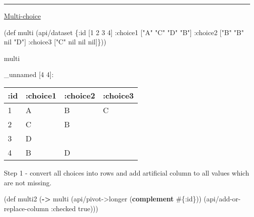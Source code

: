 \documentclass[]{article}
\newenvironment{Shaded}{\begin{snugshade}}{\end{snugshade}}
\newcommand{\AttributeTok}[1]{\textcolor[rgb]{0.77,0.63,0.00}{#1}}
\newcommand{\BuiltInTok}[1]{#1}
\newcommand{\DecValTok}[1]{\textcolor[rgb]{0.00,0.00,0.81}{#1}}
\newcommand{\FunctionTok}[1]{\textcolor[rgb]{0.00,0.00,0.00}{#1}}
\newcommand{\KeywordTok}[1]{\textcolor[rgb]{0.13,0.29,0.53}{\textbf{#1}}}
\newcommand{\NormalTok}[1]{#1}
\newcommand{\StringTok}[1]{\textcolor[rgb]{0.31,0.60,0.02}{#1}}
\newcommand{\VariableTok}[1]{\textcolor[rgb]{0.00,0.00,0.00}{#1}}
\begin{document}
\begin{center}\rule{0.5\linewidth}{0.5pt}\end{center}

\href{https://tidyr.tidyverse.org/articles/pivot.html\#multi-choice}{Multi-choice}

\begin{Shaded}
\begin{Highlighting}[]
\NormalTok{(}\BuiltInTok{def}\FunctionTok{ multi }\NormalTok{(api/dataset \{}\AttributeTok{:id}\NormalTok{ [}\DecValTok{1} \DecValTok{2} \DecValTok{3} \DecValTok{4}\NormalTok{]}
                         \AttributeTok{:choice1}\NormalTok{ [}\StringTok{"A"} \StringTok{"C"} \StringTok{"D"} \StringTok{"B"}\NormalTok{]}
                         \AttributeTok{:choice2}\NormalTok{ [}\StringTok{"B"} \StringTok{"B"} \VariableTok{nil} \StringTok{"D"}\NormalTok{]}
                         \AttributeTok{:choice3}\NormalTok{ [}\StringTok{"C"} \VariableTok{nil} \VariableTok{nil} \VariableTok{nil}\NormalTok{]\}))}
\end{Highlighting}
\end{Shaded}

\begin{Shaded}
\begin{Highlighting}[]
\NormalTok{multi}
\end{Highlighting}
\end{Shaded}

\_unnamed {[}4 4{]}:

\begin{longtable}[]{@{}llll@{}}
\toprule
:id & :choice1 & :choice2 & :choice3\tabularnewline
\midrule
\endhead
1 & A & B & C\tabularnewline
2 & C & B &\tabularnewline
3 & D & &\tabularnewline
4 & B & D &\tabularnewline
\bottomrule
\end{longtable}

Step 1 - convert all choices into rows and add artificial column to all
values which are not missing.

\begin{Shaded}
\begin{Highlighting}[]
\NormalTok{(}\BuiltInTok{def}\FunctionTok{ multi2 }\NormalTok{(}\KeywordTok{->}\NormalTok{ multi}
\NormalTok{                (api/pivot->longer (}\KeywordTok{complement}\NormalTok{ #\{}\AttributeTok{:id}\NormalTok{\}))}
\NormalTok{                (api/add-or-replace-column }\AttributeTok{:checked} \VariableTok{true}\NormalTok{)))}
\end{Highlighting}
\end{Shaded}
\end{document}
